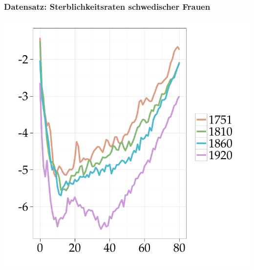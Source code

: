 \documentclass[xcolor=dvipsnames, compress, serif, professionalfont, handout]{beamer}
\newenvironment{knitrout}{}{} %
\renewenvironment{knitrout}{\begin{footnotesize}}{\end{footnotesize}}
\begin{document}
\begin{frame}[fragile]
\frametitle{Datensatz: Sterblichkeitsraten schwedischer Frauen}


  \hspace{-0.1cm}   
  \begin{minipage}{0.48\textwidth}
\begin{knitrout}
\color{fgcolor}

{\centering \includegraphics[width=\linewidth,height=\linewidth]{figure/graphics-GR_bspmort} 

}


\end{knitrout}

  \end{minipage} 
  \hspace{0.1cm}
  \begin{minipage}{0.48\textwidth}
\begin{knitrout}
\color{fgcolor}


\end{knitrout}
\end{minipage}
\end{frame}
\end{document}
